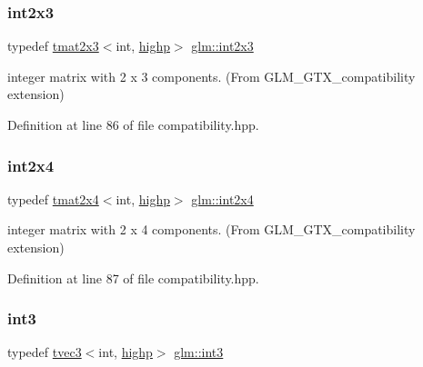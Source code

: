 \subsubsection{\texorpdfstring{int2x3}{int2x3}}
{\footnotesize\ttfamily typedef \mbox{\hyperlink{structglm_1_1tmat2x3}{tmat2x3}}$<$int, \mbox{\hyperlink{namespaceglm_a0f04f086094c747d227af4425893f545ac6f7eab42eacbb10d59a58e95e362074}{highp}}$>$ \mbox{\hyperlink{group__gtx__compatibility_ga37b2b18255fa5ff7fa23d8b1d34b8034}{glm\+::int2x3}}}



integer matrix with 2 x 3 components. (From G\+L\+M\+\_\+\+G\+T\+X\+\_\+compatibility extension) 



Definition at line 86 of file compatibility.\+hpp.

\mbox{\label{group__gtx__compatibility_gaa402ce479f756c0805d25fede99251e3}} 
\subsubsection{\texorpdfstring{int2x4}{int2x4}}
{\footnotesize\ttfamily typedef \mbox{\hyperlink{structglm_1_1tmat2x4}{tmat2x4}}$<$int, \mbox{\hyperlink{namespaceglm_a0f04f086094c747d227af4425893f545ac6f7eab42eacbb10d59a58e95e362074}{highp}}$>$ \mbox{\hyperlink{group__gtx__compatibility_gaa402ce479f756c0805d25fede99251e3}{glm\+::int2x4}}}



integer matrix with 2 x 4 components. (From G\+L\+M\+\_\+\+G\+T\+X\+\_\+compatibility extension) 



Definition at line 87 of file compatibility.\+hpp.

\mbox{\label{group__gtx__compatibility_gafc297ec294f5aa0360a634656c20e1d0}} 
\subsubsection{\texorpdfstring{int3}{int3}}
{\footnotesize\ttfamily typedef \mbox{\hyperlink{structglm_1_1tvec3}{tvec3}}$<$int, \mbox{\hyperlink{namespaceglm_a0f04f086094c747d227af4425893f545ac6f7eab42eacbb10d59a58e95e362074}{highp}}$>$ \mbox{\hyperlink{group__gtx__compatibility_gafc297ec294f5aa0360a634656c20e1d0}{glm\+::int3}}}



